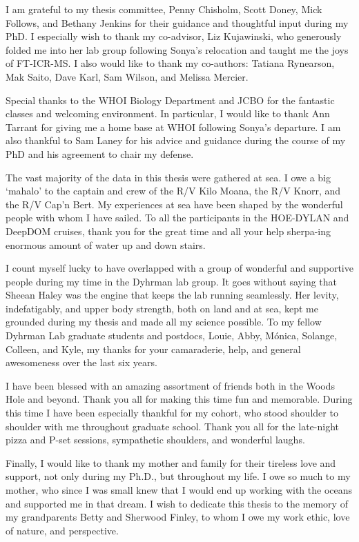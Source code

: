 {I am grateful to my thesis committee, Penny Chisholm, Scott Doney, Mick Follows, and Bethany Jenkins for their guidance and thoughtful input during my PhD. I especially wish to thank my co-advisor, Liz Kujawinski, who generously folded me into her lab group following Sonya's relocation and taught me the joys of FT-ICR-MS. I also would like to thank my co-authors: Tatiana Rynearson, Mak Saito, Dave Karl, Sam Wilson, and Melissa Mercier. \par 

Special thanks to the WHOI Biology Department and JCBO for the fantastic classes and welcoming environment. In particular, I would like to thank Ann Tarrant for giving me a home base at WHOI following Sonya's departure. I am also thankful to Sam Laney for his advice and guidance during the course of my PhD and his agreement to chair my defense. \par 

The vast majority of the data in this thesis were gathered at sea. I owe a big `mahalo' to the captain and crew of the R/V Kilo Moana, the R/V Knorr, and the R/V Cap'n Bert. My experiences at sea have been shaped by the wonderful people with whom I have sailed. To all the participants in the HOE-DYLAN and DeepDOM cruises, thank you for the great time and all your help sherpa-ing enormous amount of water up and down stairs.\par

I count myself lucky to have overlapped with a group of wonderful and supportive people during my time in the Dyhrman lab group. It goes without saying that Sheean Haley was the engine that keeps the lab running seamlessly. Her levity, indefatigably, and upper body strength, both on land and at sea, kept me grounded during my thesis and made all my science possible. To my fellow Dyhrman Lab graduate students and postdocs, Louie, Abby, M\'{o}nica, Solange, Colleen, and Kyle, my thanks for your camaraderie, help, and general awesomeness over the last six years. \par
I have been blessed with an amazing assortment of friends both in the Woods Hole and beyond. Thank you all for making this time fun and memorable. During this time I have been especially thankful for my cohort, who stood shoulder to shoulder with me throughout graduate school. Thank you all for the late-night pizza and P-set sessions, sympathetic shoulders, and wonderful laughs. \par

Finally, I would like to thank my mother and family for their tireless love and support, not only during my Ph.D., but throughout my life. I owe so much to my mother, who since I was small knew that I would end up working with the oceans and supported me in that dream. I wish to dedicate this thesis to the memory of my grandparents Betty and Sherwood Finley, to whom I owe my work ethic, love of nature, and perspective.\par 


}
 


